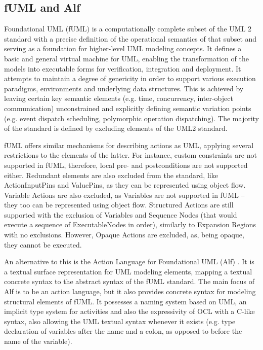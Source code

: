 \subsection{fUML and Alf} \label{subsection_background_comparison_fUMLAlf}
Foundational UML (fUML) \cite{fUMLStandard} is a computationally complete subset of the UML 2 standard with a precise definition of the operational semantics of that subset and serving as a foundation for higher-level UML modeling concepts. It defines a basic and general virtual machine for UML, enabling the transformation of the models into executable forms for verification, integration and deployment. It attempts to maintain a degree of genericity in order to support various execution paradigms, environments and underlying data structures. This is achieved by leaving certain key semantic elements (e.g. time, concurrency, inter-object communication) unconstrained and explicitly defining semantic variation points (e.g. event dispatch scheduling, polymorphic operation dispatching). The majority of the standard is defined by excluding elements of the UML2 standard.

fUML offers similar mechanisms for describing actions as UML, applying several restrictions to the elements of the latter. For instance, custom constraints are not supported in fUML, therefore, local pre- and postconditions are not supported either. Redundant elements are also excluded from the standard, like ActionInputPins and ValuePins, as they can be represented using object flow. Variable Actions are also excluded, as Variables are not supported in fUML -- they too can be represented using object flow. Structured Actions are still supported with the exclusion of Variables and Sequence Nodes (that would execute a sequence of ExecutableNodes in order), similarly to Expansion Regions with no exclusions. However, Opaque Actions are excluded, as, being opaque, they cannot be executed.

An alternative to this is the Action Language for Foundational UML (Alf) \cite{AlfStandard}. It is a textual surface representation for UML modeling elements, mapping a textual concrete syntax to the abstract syntax of the fUML standard. The main focus of Alf is to be an action language, but it also provides concrete syntax for modeling structural elements of fUML. It possesses a naming system based on UML, an implicit type system for activities and also the expressivity of OCL \cite{OCLStandard} with a C-like syntax, also allowing the UML textual syntax whenever it exists (e.g. type declaration of variables after the name and a colon, as opposed to before the name of the variable). 

